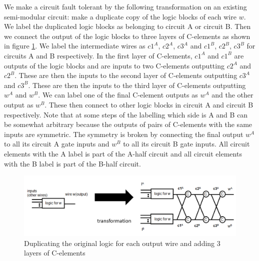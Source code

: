 \documentclass[12pt]{report}
\begin{document}

We make a circuit fault tolerant by the following transformation on an existing semi-modular circuit: make a duplicate copy of the logic blocks of each wire $w$.  We label the duplicated logic blocks as belonging to circuit A or circuit B.  Then we connect the output of the logic blocks to three layers of C-elements as shown in figure \ref{fig:dupscheme}.  We label the intermediate wires as $c1^A$, $c2^A$, $c3^A$ and $c1^B$, $c2^B$, $c3^B$ for circuits A and B respectively.  In the first layer of C-elements, $c1^A$ and $c1^B$ are outputs of the logic blocks and are inputs to two C-elements outputting $c2^A$ and $c2^B$.  These are then the inputs to the second layer of C-elements outputting $c3^A$ and $c3^B$.  These are then the inputs to the third layer of C-elements outputting $w^A$ and $w^B$.  We can label one of the final C-element outputs as $w^A$ and the other output as $w^B$.  These then connect to other logic blocks in circuit A and circuit B respectively.  Note that at some steps of the labelling which side is A and B can be somewhat arbitrary because the outputs of pairs of C-elements with the same inputs are symmetric.  The symmetry is broken by connecting the final output $w^A$ to all its circuit A gate inputs and $w^B$ to all its circuit B gate inputs.  All circuit elements with the A label is part of the A-half circuit and all circuit elements with the B label is part of the B-half circuit.\\%
\begin{figure}
  \centering
    \includegraphics[width=\textwidth]{circuitforproof3}
  \caption{Duplicating the original logic for each output wire and adding 3 layers of C-elements}
  \label{fig:dupscheme}
\end{figure}
\end{document}
